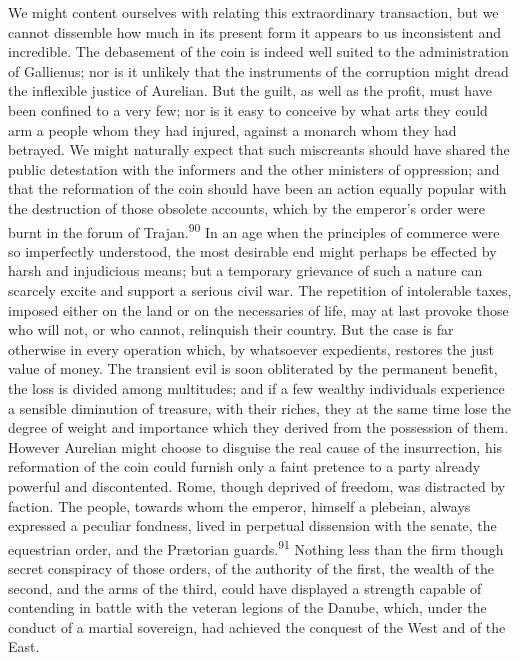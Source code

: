 We might content ourselves with relating this extraordinary
transaction, but we cannot dissemble how much in its present form
it appears to us inconsistent and incredible. The debasement of
the coin is indeed well suited to the administration of
Gallienus; nor is it unlikely that the instruments of the
corruption might dread the inflexible justice of Aurelian. But
the guilt, as well as the profit, must have been confined to a
very few; nor is it easy to conceive by what arts they could arm
a people whom they had injured, against a monarch whom they had
betrayed. We might naturally expect that such miscreants should
have shared the public detestation with the informers and the
other ministers of oppression; and that the reformation of the
coin should have been an action equally popular with the
destruction of those obsolete accounts, which by the emperor’s
order were burnt in the forum of Trajan.\textsuperscript{90} In an age when the
principles of commerce were so imperfectly understood, the most
desirable end might perhaps be effected by harsh and injudicious
means; but a temporary grievance of such a nature can scarcely
excite and support a serious civil war. The repetition of
intolerable taxes, imposed either on the land or on the
necessaries of life, may at last provoke those who will not, or
who cannot, relinquish their country. But the case is far
otherwise in every operation which, by whatsoever expedients,
restores the just value of money. The transient evil is soon
obliterated by the permanent benefit, the loss is divided among
multitudes; and if a few wealthy individuals experience a
sensible diminution of treasure, with their riches, they at the
same time lose the degree of weight and importance which they
derived from the possession of them. However Aurelian might
choose to disguise the real cause of the insurrection, his
reformation of the coin could furnish only a faint pretence to a
party already powerful and discontented. Rome, though deprived of
freedom, was distracted by faction. The people, towards whom the
emperor, himself a plebeian, always expressed a peculiar
fondness, lived in perpetual dissension with the senate, the
equestrian order, and the Prætorian guards.\textsuperscript{91} Nothing less than
the firm though secret conspiracy of those orders, of the
authority of the first, the wealth of the second, and the arms of
the third, could have displayed a strength capable of contending
in battle with the veteran legions of the Danube, which, under
the conduct of a martial sovereign, had achieved the conquest of
the West and of the East.

